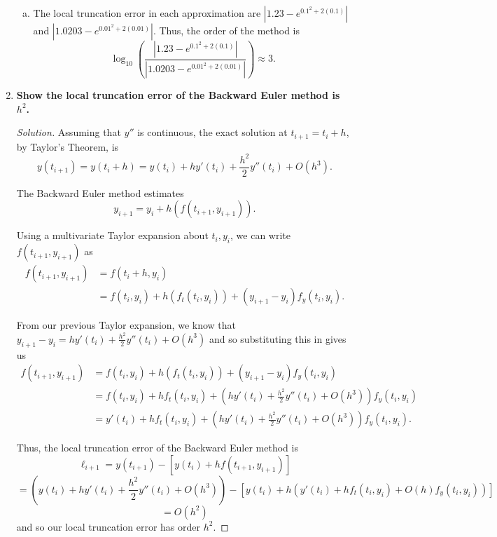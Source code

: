 \documentclass[11pt]{article}
\newenvironment{solution}
  {\renewcommand\qedsymbol{$\blacksquare$}\begin{proof}[Solution]}
  {\end{proof}}
\theoremstyle{definition}
\begin{document}
\begin{enumerate}
\begin{enumerate}[a)]
        \item The local truncation error in each approximation are $\left|1.23 - e^{0.1^2 + 2(0.1)}\right|$ and $\left|1.0203 - e^{0.01^2 + 2(0.01)} \right|.$ 
         Thus, the order of the method is \[ \log_{10} \left( \frac{\left|1.23 - e^{0.1^2 + 2(0.1)}\right|}{\left|1.0203 - e^{0.01^2 + 2(0.01)} \right|} \right) \approx \boxed{3}. \]
    \end{enumerate}

    \newpage

    \item \textbf{Show the local truncation error of the Backward Euler method is $h^2$.}
    
    \begin{solution}
    Assuming that $y''$ is continuous, the exact solution at $t_{i+1} = t_i + h$, by Taylor's Theorem, is
    \[ y(t_{i+1}) = y(t_i + h) = y(t_i) + hy'(t_i) + \frac{h^2}{2}y''(t_i) + O(h^3). \]

    The Backward Euler method estimates \[y_{i+1} = y_i + h(f(t_{i+1}, y_{i+1})).\]

    Using a multivariate Taylor expansion about $t_i, y_i$, we can write $f(t_{i+1}, y_{i+1})$ as
    \begin{align*} f(t_{i+1}, y_{i+1}) &= f(t_i + h, y_i) \\
        &= f(t_i, y_i) + h(f_t(t_i, y_i)) + (y_{i+1} - y_i)f_y(t_i, y_i).
    \end{align*}

    From our previous Taylor expansion, we know that $y_{i+1} - y_{i} = hy'(t_i) + \frac{h^2}{2}y''(t_i) + O(h^3)$ and so substituting this in gives us
    \begin{align*} f(t_{i+1}, y_{i+1}) &= f(t_i, y_i) + h(f_t(t_i, y_i)) + (y_{i+1} - y_i)f_y(t_i, y_i) \\
    &= f(t_i, y_i) + hf_t(t_i, y_i) + \left(hy'(t_i) + \frac{h^2}{2}y''(t_i) + O(h^3)\right)f_y(t_i, y_i) \\
    &= y'(t_i) + hf_t(t_i, y_i) + \left(hy'(t_i) + \frac{h^2}{2}y''(t_i) + O(h^3)\right)f_y(t_i, y_i).
    \end{align*}

    Thus, the local truncation error of the Backward Euler method is
    \[ \ell_{i+1} = y(t_{i+1}) - [y(t_i) + hf(t_{i+1}, y_{i+1})] \]
    \[ = \left( y(t_i) + hy'(t_i) + \frac{h^2}{2}y''(t_i) + O(h^3) \right) - \left[ y(t_i) + h\left(y'(t_i) + hf_t(t_i, y_i) + O(h) f_y(t_i, y_i)\right) \right] \]
    \[ = O(h^2) \]
    and so our local truncation error has order $h^2$.
    \end{solution}


\end{enumerate}
\end{document}
